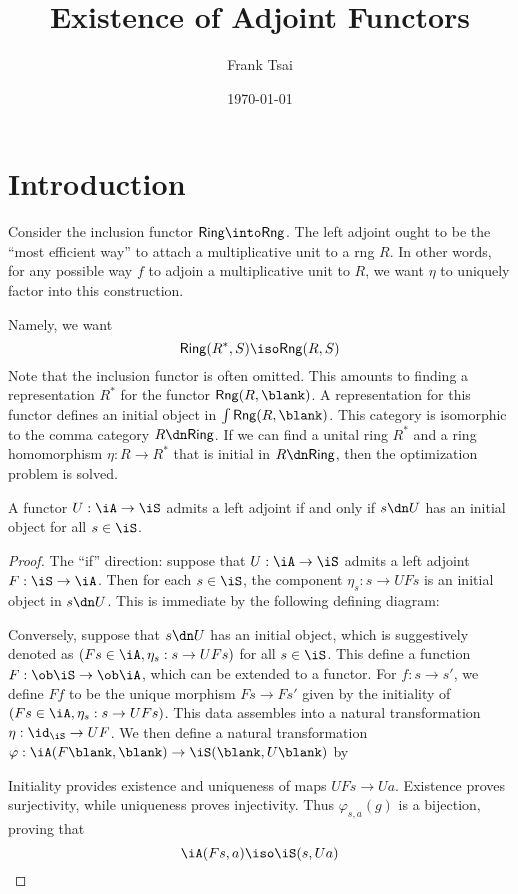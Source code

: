 \documentclass{amsart}
\title{Existence of Adjoint Functors}
\author{Frank Tsai}
\date{\today}
\begin{document}
\maketitle
\tableofcontents

\section{Introduction}
\label{sec:introduction}
Consider the inclusion functor $\mathsf{Ring} \into \mathsf{Rng}$.
The left adjoint ought to be the ``most efficient way'' to attach a multiplicative unit to a rng $R$.
In other words, for any possible way $f$ to adjoin a multiplicative unit to $R$, we want $\eta$ to uniquely factor into this construction.

Namely, we want
\[
  \mathsf{Ring}(R^{*}, S) \iso \mathsf{Rng}(R, S)
\]
Note that the inclusion functor is often omitted.
This amounts to finding a representation $R^{*}$ for the functor $\mathsf{Rng}(R,\blank)$.
A representation for this functor defines an initial object in $\int\mathsf{Rng}(R,\blank)$.
This category is isomorphic to the comma category $R \dn \mathsf{Ring}$.
If we can find a unital ring $R^{*}$ and a ring homomorphism $\eta : R \to R^{*}$ that is initial in $R \dn \mathsf{Ring}$, then the optimization problem is solved.

\begin{lem}\label{lem:left-adjoint-initial}
  A functor $U : \iA \to \iS$ admits a left adjoint if and only if $s \dn U$ has an initial object for all $s \in \iS$.
\end{lem}
\begin{proof}
  The ``if'' direction: suppose that $U : \iA \to \iS$ admits a left adjoint $F : \iS \to \iA$.
  Then for each $s \in \iS$, the component $\eta_{s} : s \to UFs$ is an initial object in $s \dn U$.
  This is immediate by the following defining diagram:
  

  Conversely, suppose that $s \dn U$ has an initial object, which is suggestively denoted as $(Fs \in \iA, \eta_{s} : s \to UFs)$ for all $s \in \iS$.
  This define a function $F : \ob\iS \to \ob\iA$, which can be extended to a functor.
  For $f : s \to s'$, we define $Ff$ to be the unique morphism $Fs \to Fs'$ given by the initiality of $(Fs \in \iA, \eta_{s} : s \to UFs)$.
  This data assembles into a natural transformation $\eta : \id_{\iS} \to UF$.
  We then define a natural transformation $\varphi : \iA(F\blank,\blank) \to \iS(\blank,U\blank)$ by
  
  Initiality provides existence and uniqueness of maps $UFs \to Ua$.
  Existence proves surjectivity, while uniqueness proves injectivity.
  Thus $\varphi_{s,a}(g)$ is a bijection, proving that
  \[
    \iA(Fs,a) \iso \iS(s,Ua)
  \]
\end{proof}
\end{document}
